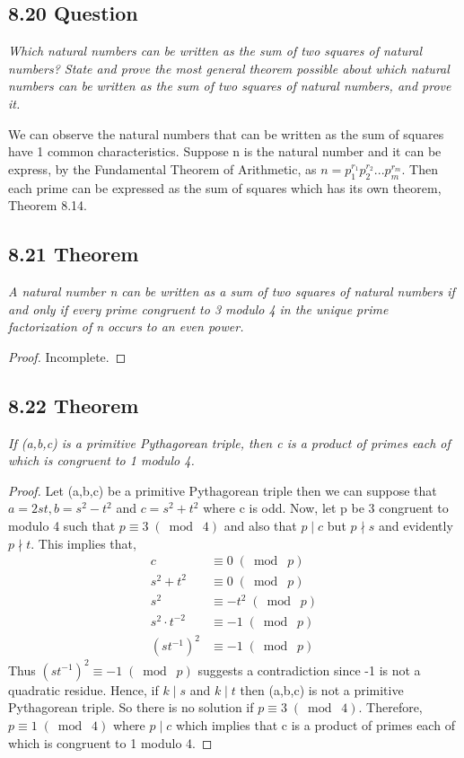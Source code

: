 \documentclass{article}
\begin{document}
\subsection*{8.20 Question} 
\quad \textit{Which natural numbers can be written as the sum of two squares of natural numbers? State and prove the most general theorem possible about which natural numbers can be written as the sum of two squares of natural numbers, and prove it.}

We can observe the natural numbers that can be written as the sum of squares have 1 common characteristics. Suppose n is the natural number and it can be express, by the Fundamental Theorem of Arithmetic, as $n = p_1^{r_1}p_2^{r_2}...p_m^{r_m}$. Then each prime can be expressed as the sum of squares which has its own theorem, Theorem 8.14.  

\subsection*{8.21 Theorem} 
\quad \textit{A natural number n can be written as a sum of two squares of natural numbers if and only if every prime congruent to 3 modulo 4 in the unique prime factorization of n occurs to an even power.}

\begin{proof}
Incomplete.
\end{proof}

\subsection*{8.22 Theorem} 
\quad \textit{If (a,b,c) is a primitive Pythagorean triple, then c is a product of primes each of which is congruent to 1 modulo 4.}

\begin{proof}
Let (a,b,c) be a primitive Pythagorean triple then we can suppose that $a = 2st, b = s^2 - t^2$ and $c = s^2 + t^2$ where c is odd. Now, let p be 3 congruent to modulo 4 such that $p \equiv 3 \;(\bmod\; 4)$ and also that $p \mid c$ but $p \nmid s$ and evidently $p \nmid t$. This implies that,
\begin{align*}
    &&c &\equiv 0 \;(\bmod\; p)&&\\
    &&s^2 + t^2 &\equiv 0 \;(\bmod\; p)&&\\
    &&s^2 &\equiv -t^2 \;(\bmod\; p)&&\\
    &&s^2 \cdot t^{-2} &\equiv -1 \;(\bmod\; p)&&\\
    &&(st^{-1})^2 &\equiv -1 \;(\bmod\; p)&&
\end{align*}
Thus $(st^{-1})^2 \equiv -1 \;(\bmod\; p)$ suggests a contradiction since -1 is not a quadratic residue.  Hence, if $k \mid s$ and $k \mid t$ then (a,b,c) is not a primitive Pythagorean triple. So there is no solution if $p \equiv 3 \;(\bmod\; 4)$. Therefore, $p \equiv 1 \;(\bmod\; 4)$ where $p \mid c$ which implies that c is a product of primes each of which is congruent to 1 modulo 4.                 
\end{proof}
\end{document}
